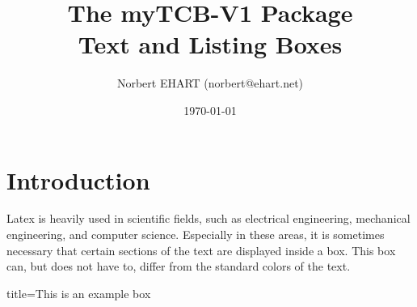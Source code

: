 \documentclass[]{myHOWTO-V001}
\title{The \textbf{myTCB-V1} Package\\{\small Text and Listing Boxes}}
\author{Norbert EHART (norbert@ehart.net)}
\date{\today}
\begin{document}
%
%


%
%

\maketitle

%
%

\tableofcontents

%
%

\section{Introduction}

Latex is heavily used in scientific fields, such as electrical engineering, mechanical engineering, and computer science. Especially in these areas, it is sometimes necessary that certain sections of the text are displayed inside a box. This box can, but does not have to, differ from the standard colors of the text.

\begin{myBOX}{title={This is an example box}}
\lipsum[4]
\end{myBOX}
\end{document}
